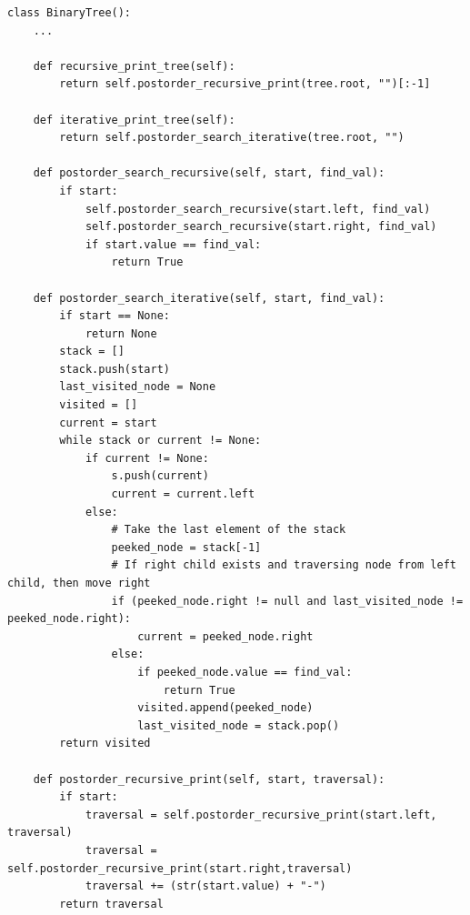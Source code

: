 \begin{lstlisting}[firstnumber=1, caption={Recursive and iterative implementation of post-order traversal.}]
class BinaryTree():
	...

	def recursive_print_tree(self):
		return self.postorder_recursive_print(tree.root, "")[:-1]
	
	def iterative_print_tree(self):
		return self.postorder_search_iterative(tree.root, "")

	def postorder_search_recursive(self, start, find_val):
		if start:
			self.postorder_search_recursive(start.left, find_val)
			self.postorder_search_recursive(start.right, find_val)
			if start.value == find_val:
				return True

	def postorder_search_iterative(self, start, find_val):
		if start == None:
			return None
		stack = []
		stack.push(start)
		last_visited_node = None
		visited = []
		current = start
		while stack or current != None:
			if current != None:
				s.push(current)
				current = current.left
			else:
				# Take the last element of the stack
				peeked_node = stack[-1]
				# If right child exists and traversing node from left child, then move right
				if (peeked_node.right != null and last_visited_node != peeked_node.right):
					current = peeked_node.right
				else:
					if peeked_node.value == find_val:
						return True
					visited.append(peeked_node)
					last_visited_node = stack.pop()
		return visited

	def postorder_recursive_print(self, start, traversal):
		if start:
			traversal = self.postorder_recursive_print(start.left, traversal)
			traversal = self.postorder_recursive_print(start.right,traversal)
			traversal += (str(start.value) + "-")
		return traversal
\end{lstlisting}

